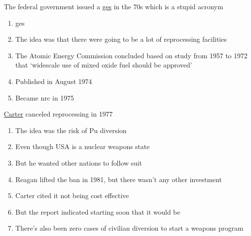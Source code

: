 \documentclass[aspectratio=1610,pdftex,dvipsnames,compress,xcolor={dvipsnames}]{beamer}
\newcommand{\acf}{\acrfull} %
\newcommand{\acs}{\acrshort} %
\begin{document}
\addtocounter{framenumber}{-1} 
\begin{frame}{The federal government issued a \href{https://www.nrc.gov/docs/ML0710/ML071000110.pdf}{\acs{ges}} in the 70s which is a stupid acronym}
    \begin{enumerate}[series=outerlist,topsep=0pt,itemsep=21pt,leftmargin=*,label=(\arabic*)]
        \item[]\acf{ges}
        \item[]The idea was that there were going to be a lot of reprocessing facilities
        \item[]The Atomic Energy Commission concluded based on study from 1957 to 1972 that `widescale use of mixed oxide fuel should be approved'
        \item[]Published in August 1974
        \item[]Became \acs{nrc} in 1975
    \end{enumerate}
\end{frame}


\begin{frame}{\href{https://www.forbes.com/sites/realspin/2014/10/01/why-doesnt-u-s-recycle-nuclear-fuel/?sh=224f7e7c390f}{Carter} canceled reprocessing in 1977}
    \begin{enumerate}[series=outerlist,topsep=0pt,itemsep=15pt,leftmargin=*,label=(\arabic*)]
        \item[]The idea was the risk of Pu diversion
        \item[]Even though USA is a nuclear weapons state
        \item[]But he wanted other nations to follow suit
        \item[]Reagan lifted the ban in 1981, but there wasn't any other investment
        \item[]Carter cited it not being cost effective 
        \item[]But the report indicated starting soon that it would be
        \item[]There's also been zero cases of civilian diversion to start a weapons program
    \end{enumerate}
\end{frame}
\end{document}
